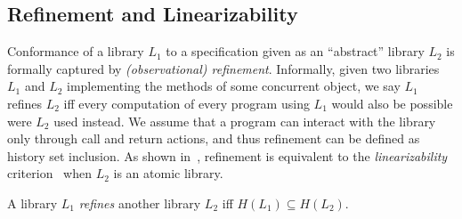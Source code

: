 \subsection{Refinement and Linearizability}

Conformance of a library $L_1$ to a specification given as an ``abstract'' library $L_2$ 
is formally captured by \emph{(observational) refinement}. Informally, given two libraries
$L_1$ and $L_2$ implementing the methods of some concurrent object, we
say $L_1$ refines $L_2$ if{f} every computation of every program
using $L_1$ would also be possible were $L_2$ used instead. We assume that a program can 
interact with the library only through call and return actions, and thus refinement can be defined
as history set inclusion. As shown in~\citet{journals/tcs/FilipovicORY10,DBLP:conf/popl/BouajjaniEEH15},
refinement is equivalent to the \emph{linearizability} criterion~\cite{journals/toplas/HerlihyW90} when $L_2$ is an atomic library. 

\begin{definition}
A library $L_1$ \emph{refines} another library $L_2$ if{f} $H(L_1) \subseteq H(L_2)$.
\end{definition}

